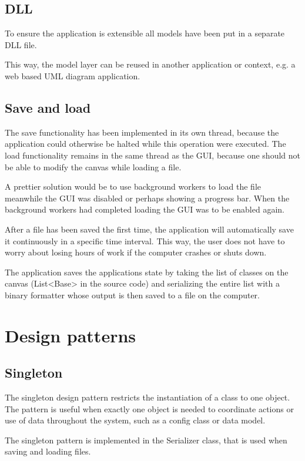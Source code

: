 \subsection{DLL}
To ensure the application is extensible all models have been put in a separate DLL file.

This way, the model layer can be reused in another application or context, e.g.  a web based UML diagram application.

\subsection{Save and load}
The save functionality has been implemented in its own thread, because the application could otherwise be halted while this operation were executed. The load functionality remains in the same thread as the GUI, because one should not be able to modify the canvas while loading a file.

A prettier solution would be to use background workers to load the file meanwhile the GUI was disabled or perhaps showing a progress bar. When the background workers had completed loading the GUI was to be enabled again.

After a file has been saved the first time, the application will automatically save it continuously in a specific time interval. This way, the user does not have to worry about losing hours of work if the computer crashes or shuts down.

The application saves the applications state by taking the list of classes on the canvas (\textsf{List<Base>} in the source code) and serializing the entire list with a binary formatter whose output is then saved to a file on the computer.

\section{Design patterns}
\label{sec:design_pattern}
\subsection{Singleton}
The singleton design pattern restricts the instantiation of a class to one object.
The pattern is useful when exactly one object is needed to coordinate actions or use of data throughout the system, such as a config class or data model.

The singleton pattern is implemented in the \textsf{Serializer} class, that is used when saving and loading files. 

